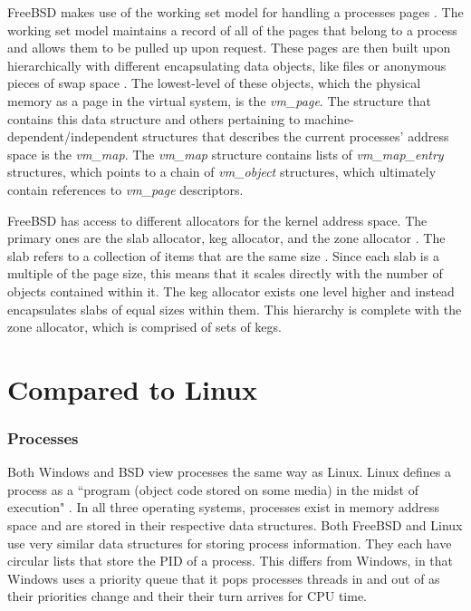 \documentclass[10pt,draftclsnofoot,onecolumn]{IEEEtran}
\begin{document}
\par FreeBSD makes use of the working set model for handling a processes pages \cite{bsd:1}.
The working set model maintains a record of all of the pages that belong to a process and allows them to be pulled up upon request.
These pages are then built upon hierarchically with different encapsulating data objects, like files or anonymous pieces of swap space \cite{bsd:1}.
The lowest-level of these objects, which the physical memory as a page in the virtual system, is the \textit{vm\_page}.
The structure that contains this data structure and others pertaining to machine-dependent/independent structures that describes the current processes' address space is the \textit{vm\_map}.
The \textit{vm\_map} structure contains lists of \textit{vm\_map\_entry} structures, which points to a chain of \textit{vm\_object} structures, which ultimately contain references to \textit{vm\_page} descriptors.

\par FreeBSD has access to different allocators for the kernel address space.
The primary ones are the slab allocator, keg allocator, and the zone allocator \cite{bsd:1}.
The slab refers to a collection of items that are the same size \cite{bsd:1}.
Since each slab is a multiple of the page size, this means that it scales directly with the number of objects contained within it.
The keg allocator exists one level higher and instead encapsulates slabs of equal sizes within them.
This hierarchy is complete with the zone allocator, which is comprised of sets of kegs.

\section{Compared to Linux}

\subsubsection{Processes}
\label{sub:Process Linux}
\par Both Windows and BSD view processes the same way as Linux.
Linux defines a process as a ``program (object code stored on some media) in the midst of execution" \cite{linux:1}.
In all three operating systems, processes exist in memory address space and are stored in their respective data structures.
Both FreeBSD and Linux use very similar data structures for storing process information.
They each have circular lists that store the PID of a process.
This differs from Windows, in that Windows uses a priority queue that it pops processes threads in and out of as their priorities change and their their turn arrives for CPU time.
\end{document}

